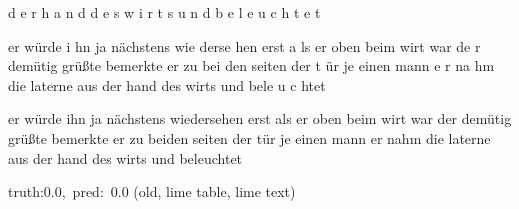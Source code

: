 \documentclass[a4paper,10pt,twoside]{article}
\begin{document}
{\color[rgb]{0.0,0,0} d}{\color[rgb]{0.077,0,0} e}{\color[rgb]{0.088,0,0} r} {\color[rgb]{0.0,0,0} h}{\color[rgb]{0.0,0,0} a}{\color[rgb]{0.0,0,0} n}{\color[rgb]{0.0,0,0} d} {\color[rgb]{0.007,0,0} d}{\color[rgb]{0.061,0,0} e}{\color[rgb]{0.0,0,0} s} {\color[rgb]{0.05,0,0} w}{\color[rgb]{0.0,0,0} i}{\color[rgb]{0.0,0,0} r}{\color[rgb]{0.0,0,0} t}{\color[rgb]{0.051,0,0} s} {\color[rgb]{0.0,0,0} u}{\color[rgb]{0.055,0,0} n}{\color[rgb]{0.0,0,0} d} {\color[rgb]{0.03,0,0} b}{\color[rgb]{0.057,0,0} e}{\color[rgb]{0.0,0,0} l}{\color[rgb]{0.0,0,0} e}{\color[rgb]{0.0,0,0} u}{\color[rgb]{0.138,0,0} c}{\color[rgb]{0.0,0,0} h}{\color[rgb]{0.245,0,0} t}{\color[rgb]{0.0,0,0} e}{\color[rgb]{0.0,0,0} t}

er würde i{\color[rgb]{1,0,0} h}n {\color[rgb]{1,0,0} j}a nächstens wie{\color[rgb]{1,0,0} d}erse{\color[rgb]{0,0,1} h}en  erst a{\color[rgb]{1,0,0} l}s er oben beim wirt war  {\color[rgb]{1,0,0} d}e{\color[rgb]{0,0,1} r} {\color[rgb]{0,0,1} d}emütig grüßte  {\color[rgb]{1,0,0} b}emerkte er {\color[rgb]{0,0,1} z}u bei{\color[rgb]{0,0,1} d}en {\color[rgb]{0,0,1} s}eiten der t{\color[rgb]{1,0,0} ü}r {\color[rgb]{0,0,1} j}e einen mann  e{\color[rgb]{0,0,1} r} na{\color[rgb]{0,0,1} h}m die laterne aus der hand des wirts und bele{\color[rgb]{0,0,1} u}{\color[rgb]{1,0,0} c}{\color[rgb]{0,0,1} h}tet

 er würde ihn {\color[rgb]{0,0,1} ja} {\color[rgb]{0,0,1} nächstens} {\color[rgb]{0,0,1} wiedersehen} erst als er oben beim wirt war der demütig {\color[rgb]{0,0,1} grüßte} bemerkte er zu beiden seiten der tür je einen mann er nahm die laterne aus {\color[rgb]{0,0,1} der} hand des wirts und beleuchtet

 {\footnotesize {\color[rgb]{0.6, 0.6, 0.6}truth:0.0,~pred:~0.0}} (old, lime table, lime text)\hrulefill
\end{document}

